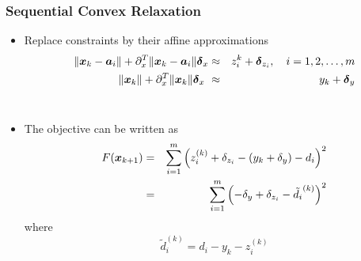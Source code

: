 \documentclass [t] {beamer} %
\begin{document}
\begin{frame} %
\frametitle{Sequential Convex Relaxation}
\phantom{m}
\begin{itemize}
\item
Replace constraints by their affine approximations
\setcounter{abc}{0}
\begin{eqnarray}
\nonumber
\|\mbox{\boldmath$x$}_{k} - \mbox{\boldmath$a$}_i\| + \partial_x^T\|\mbox{\boldmath$x$}_{k} - \mbox{\boldmath$a$}_i\|\mbox{\boldmath${\delta}$}_x &\approx & z_i^{k} + \mbox{\boldmath${\delta}$}_{z_i}, \quad i = 1, 2, \ldots, m \\
\nonumber
\|\mbox{\boldmath$x$}_{k}\|  + \partial_x^T\|\mbox{\boldmath$x$}_{k}\|\mbox{\boldmath${\delta}$}_x\ &\approx & y_{k}  + \mbox{\boldmath${\delta}$}_y
\end{eqnarray}
\\
\item
The objective  can be written as
\begin{eqnarray} 
\nonumber
F(\mbox{\boldmath$x$}_{k+1}) & =  & \sum^m_{i = 1} \left(z^{(k)}_i + \delta_{z_i} - (y_k + \delta_y) - d_i \right)^2 \\
\nonumber
& = & \sum^m_{i = 1} \left(- \delta_y + \delta_{z_i}  - \tilde{d_i}^{(k)} \right)^2
\end{eqnarray}
where 
\begin{equation}
\nonumber
\tilde{d}^{(k)}_i =  d_i - y_k - z_i^{(k)}
\end{equation}

\end{itemize}
\end{frame}
\end{document}
